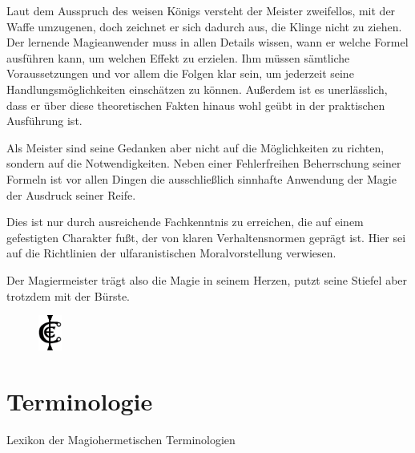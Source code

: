\documentclass[a5paper,8pt]{book}
\begin{document}
Laut dem Ausspruch des weisen Königs versteht der Meister zweifellos, mit der
Waffe umzugenen, doch zeichnet er sich dadurch aus, die Klinge nicht zu ziehen.
Der lernende Magieanwender muss in allen Details wissen, wann er welche Formel
ausführen kann, um welchen Effekt zu erzielen. Ihm müssen sämtliche
Voraussetzungen und vor allem die Folgen klar sein, um jederzeit seine
Handlungsmöglichkeiten einschätzen zu können. Außerdem ist es unerlässlich, dass
er über diese theoretischen Fakten hinaus wohl geübt in der praktischen
Ausführung ist.

Als Meister sind seine Gedanken aber nicht auf die Möglichkeiten zu richten,
sondern auf die Notwendigkeiten. Neben einer Fehlerfreihen Beherrschung seiner
Formeln ist vor allen Dingen die ausschließlich sinnhafte Anwendung der Magie der
Ausdruck seiner Reife. 

Dies ist nur durch ausreichende Fachkenntnis zu erreichen, die auf einem
gefestigten Charakter fußt, der von klaren Verhaltensnormen geprägt ist. Hier sei
auf die Richtlinien der ulfaranistischen Moralvorstellung verwiesen.

Der Magiermeister trägt also die Magie in seinem Herzen, putzt seine Stiefel aber
trotzdem mit der Bürste.
\begin{figure}[h]
\raggedleft
\includegraphics[width=0.3in]{pictures/Cordo_Siegel}
\end{figure}



\newpage

\chapter{Terminologie}

\begin{huge}
Lexikon der Magiohermetischen Terminologien
\end{huge}
\end{document}
